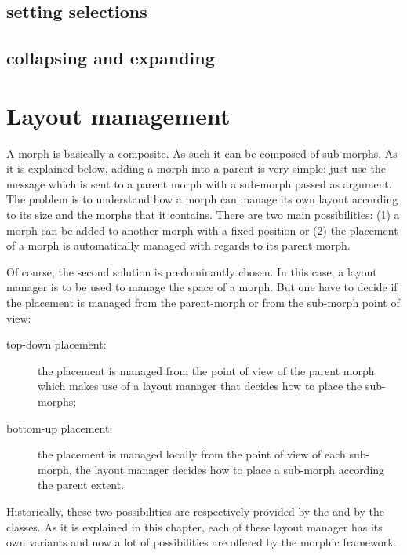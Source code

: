 \documentclass[a4paper,10pt,twoside]{book}
\begin{document}
\subsection{setting selections}
\subsection{collapsing and expanding}

\section{Layout management}


A morph is basically a composite. As such it can be composed of sub-morphs. As it is explained below, adding a morph into a parent is very simple: just use the  message which is sent to a parent morph with a sub-morph passed as argument. The problem is to understand how a morph can manage its own layout according to its size and the morphs that it contains. There are two main possibilities: (1) a morph can be added to another morph with a fixed position or (2) the placement of a morph is automatically managed with regards to its parent morph.

Of course, the second solution is predominantly chosen. In this case, a layout manager is to be used to manage the space of a morph. But one have to decide if the placement is managed from the parent-morph or from the sub-morph point of view:
\begin{description}
\item[top-down placement:] the placement is managed from the point of view of the parent morph which makes use of a layout manager that decides how to place the sub-morphs;
\item[bottom-up placement:] the placement is managed locally from the point of view of each sub-morph, the layout manager decides how to place a sub-morph according the parent extent.
\end{description}
Historically, these two possibilities are respectively provided by the  and by the  classes. As it is explained in this chapter, each of these layout manager has its own variants and now a lot of possibilities are offered by the morphic framework.
\end{document}
